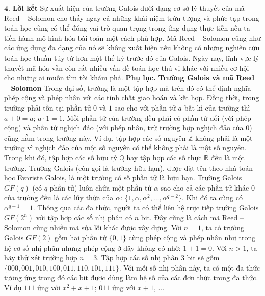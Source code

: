 \begin{multicols}{2}
\begin{figure}[H]
		\vspace*{-5pt}
	\end{figure}
	\columnbreak
	$\pmb{4.}$ \textbf{\color{toanhocdoisong}Lời kết}
	\vskip 0.1cm
	Sự xuất hiện của trường Galois dưới dạng cơ sở lý thuyết của mã Reed -- Solomon cho thấy ngay cả những khái niệm trừu tượng và phức tạp trong toán học cũng có thể đóng vai trò quan trọng trong ứng dụng thực tiễn nếu ta tiến hành mô hình hóa bài toán một cách phù hợp. Mã Reed -- Solomon cũng như các ứng dụng đa dạng của nó sẽ không xuất hiện nếu không có những nghiên cứu toán học thuần túy từ hơn một thế kỷ trước đó của Galois. Ngày nay, lĩnh vực lý thuyết mã hóa vẫn còn rất nhiều vấn đề toán học thú vị khác với nhiều cơ hội cho những ai muốn tìm tòi khám phá.
	\vskip 0.1cm
	\textbf{\color{toanhocdoisong}Phụ lục. Trường Galois và mã Reed -- Solomon}
	\vskip 0.1cm
	Trong đại số, trường là một tập hợp mà trên đó có thể định nghĩa phép cộng và phép nhân với các tính chất giao hoán và kết hợp. Đồng thời, trong trường phải tồn tại phần tử $0$ và $1$ sao cho với phần tử $a$ bất kì của trường thì $a+0=a$; $a\cdot1=1$. Mỗi phần tử của trường đều phải có phần tử đối (với phép cộng) và phần tử nghịch đảo (với phép nhân, trừ trường hợp nghịch đảo của $0$) cũng nằm trong trường này.
	\vskip 0.1cm
	Ví dụ, tập hợp các số nguyên $\mathbb{Z}$ không phải là một trường vì nghịch đảo của một số nguyên có thể không phải là một số nguyên. Trong khi đó, tập hợp các số hữu tỷ $\mathbb{Q}$ hay tập hợp các số thực $\mathbb{R}$ đều là một trường.
	\vskip 0.1cm
	Trường Galois (còn gọi là trường hữu hạn), được đặt tên theo nhà toán học Evariste Galois, là một trường có số phần tử là hữu hạn. Trường Galois $GF(q)$ (có $q$ phần tử) luôn chứa một phần tử $\alpha$ sao cho cả các phần tử khác $0$ của trường đều là các lũy thừa của $\alpha$: $\{1,\alpha,\alpha^2,\ldots,\alpha^{q-2}\}$. Khi đó ta cũng có $\alpha^{q-1}=1$.
	\vskip 0.1cm
	Thông qua các đa thức, người ta có thể liên hệ trực tiếp trường Galois $GF(2^n)$ với tập hợp các số nhị phân có $n$ bit. Đây cũng là cách mã Reed -- Solomon cùng nhiều mã sửa lỗi khác được xây dựng.
	\vskip 0.1cm
	Với $n=1$, ta có trường Galois $GF(2)$ gồm hai phần tử $\{0,1\}$ cùng phép cộng và phép nhân như trong hệ cơ số nhị phân nhưng phép cộng ở đây không có nhớ: $1+1=0$.
	\vskip 0.1cm
	Với $n > 1$, ta hãy thử xét trường hợp $n=3$. Tập hợp các số nhị phân $3$ bit sẽ gồm $\{000, 001, 010, 100, 011, 110, 101, 111\}$. Với mỗi số nhị phân này, ta có một đa thức tương ứng trong đó các bit được dùng làm hệ số của các đơn thức trong đa thức. Ví dụ $111$ ứng với $x^2+x+1$; $011$ ứng với $x+1$, ...

\end{multicols}
